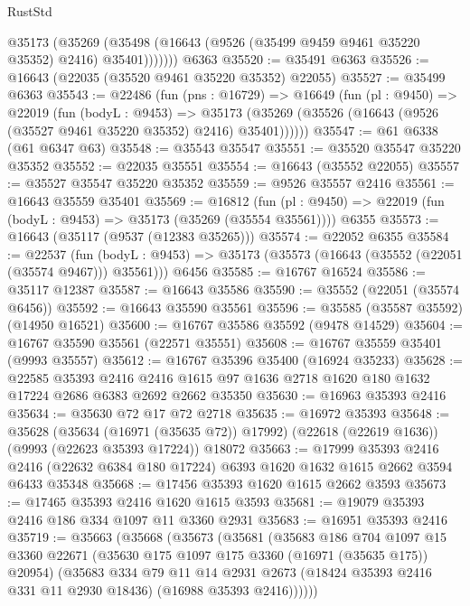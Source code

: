 \begin{lexlean}{RustStd}
\begin{coremodule}
          @35173
            (@35269 (@35498 (@16643 (@9526 (@35499 @9459 @9461 @35220 @35352) @2416) @35401)))))))
    @6363
@35520 := @35491 @6363
@35526 := @16643 (@22035 (@35520 @9461 @35220 @35352) @22055)
@35527 := @35499 @6363
@35543 := @22486
    (fun (pns : @16729) =>
    @16649
      (fun (pl : @9450) =>
      @22019
        (fun (bodyL : @9453) =>
        @35173 (@35269 (@35526 (@16643 (@9526 (@35527 @9461 @35220 @35352) @2416) @35401))))))
@35547 := @61 @6338 (@61 @6347 @63)
@35548 := @35543 @35547
@35551 := @35520 @35547 @35220 @35352
@35552 := @22035 @35551
@35554 := @16643 (@35552 @22055)
@35557 := @35527 @35547 @35220 @35352
@35559 := @9526 @35557 @2416
@35561 := @16643 @35559 @35401
@35569 := @16812
    (fun (pl : @9450) => @22019 (fun (bodyL : @9453) => @35173 (@35269 (@35554 @35561))))
    @6355
@35573 := @16643 (@35117 (@9537 (@12383 @35265)))
@35574 := @22052 @6355
@35584 := @22537
    (fun (bodyL : @9453) => @35173 (@35573 (@16643 (@35552 (@22051 (@35574 @9467))) @35561)))
    @6456
@35585 := @16767 @16524
@35586 := @35117 @12387
@35587 := @16643 @35586
@35590 := @35552 (@22051 (@35574 @6456))
@35592 := @16643 @35590 @35561
@35596 := @35585 (@35587 @35592) (@14950 @16521)
@35600 := @16767 @35586 @35592 (@9478 @14529)
@35604 := @16767 @35590 @35561 (@22571 @35551)
@35608 := @16767 @35559 @35401 (@9993 @35557)
@35612 := @16767 @35396 @35400 (@16924 @35233)
@35628 := @22585
    @35393
    @2416
    @2416
    @1615
    @97
    @1636
    @2718
    @1620
    @180
    @1632
    @17224
    @2686
    @6383
    @2692
    @2662
    @35350
@35630 := @16963 @35393 @2416
@35634 := @35630 @72 @17 @72 @2718
@35635 := @16972 @35393
@35648 := @35628
    (@35634 (@16971 (@35635 @72)) @17992)
    (@22618 (@22619 @1636))
    (@9993 (@22623 @35393 @17224))
    @18072
@35663 := @17999
    @35393
    @2416
    @2416
    (@22632 @6384 @180 @17224)
    @6393
    @1620
    @1632
    @1615
    @2662
    @3594
    @6433
    @35348
@35668 := @17456 @35393 @1620 @1615 @2662 @3593
@35673 := @17465 @35393 @2416 @1620 @1615 @3593
@35681 := @19079 @35393 @2416 @186 @334 @1097 @11 @3360 @2931
@35683 := @16951 @35393 @2416
@35719 := @35663
    (@35668
      (@35673
        (@35681
          (@35683
            @186
            @704
            @1097
            @15
            @3360
            @22671
            (@35630 @175 @1097 @175 @3360 (@16971 (@35635 @175)) @20954)
            (@35683
              @334
              @79
              @11
              @14
              @2931
              @2673
              (@18424 @35393 @2416 @331 @11 @2930 @18436)
              (@16988 @35393 @2416))))))

\end{coremodule}
\end{lexlean}
